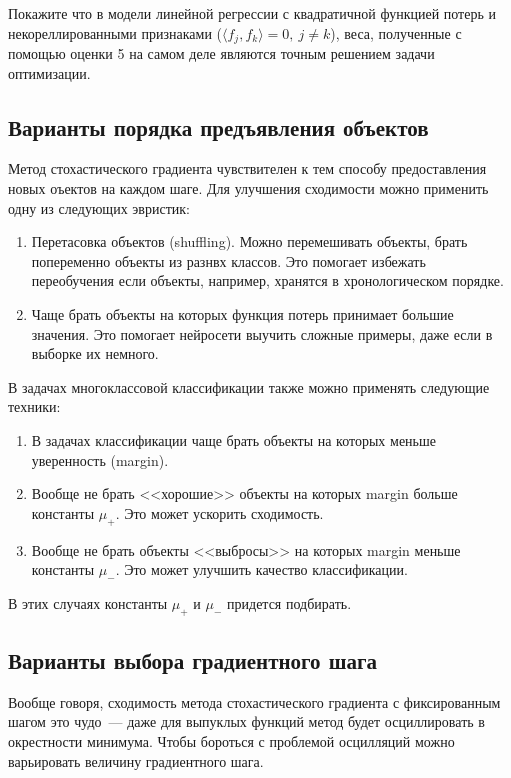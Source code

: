 \begin{problem}
Покажите что в модели линейной регрессии с квадратичной функцией потерь и некореллированными признаками ($\langle f_j, f_k \rangle = 0,\ j \neq k$), веса, полученные с помощью оценки 5 на самом деле являются точным решением задачи оптимизации.
\end{problem}

\subsection{Варианты порядка предъявления объектов}

Метод стохастического градиента чувствителен к тем способу предоставления новых оъектов на каждом шаге. Для улучшения сходимости можно применить одну из следующих эвристик:

\begin{enumerate}
    \item Перетасовка объектов (shuffling). Можно перемешивать объекты, брать попеременно объекты из разнвх классов. Это помогает избежать переобучения если объекты, например, хранятся в хронологическом порядке.
    \item Чаще брать объекты на которых функция потерь принимает большие значения. Это помогает нейросети выучить сложные примеры, даже если в выборке их немного.
\end{enumerate}

В задачах многоклассовой классификации также можно применять следующие техники:
\begin{enumerate}
    \item В задачах классификации чаще брать объекты на которых меньше уверенность (margin).
    \item Вообще не брать <<хорошие>> объекты на которых margin больше константы $\mu_+$. Это может ускорить сходимость.
    \item Вообще не брать объекты <<выбросы>> на которых margin меньше константы $\mu_-$. Это может улучшить качество классификации. 
\end{enumerate}
В этих случаях константы $\mu_+$ и $\mu_-$ придется подбирать.

\subsection{Варианты выбора градиентного шага}

Вообще говоря, сходимость метода стохастического градиента с фиксированным шагом это чудо~--- даже для выпуклых функций метод будет осциллировать в окрестности минимума. Чтобы бороться с проблемой осцилляций можно варьировать величину градиентного шага.

